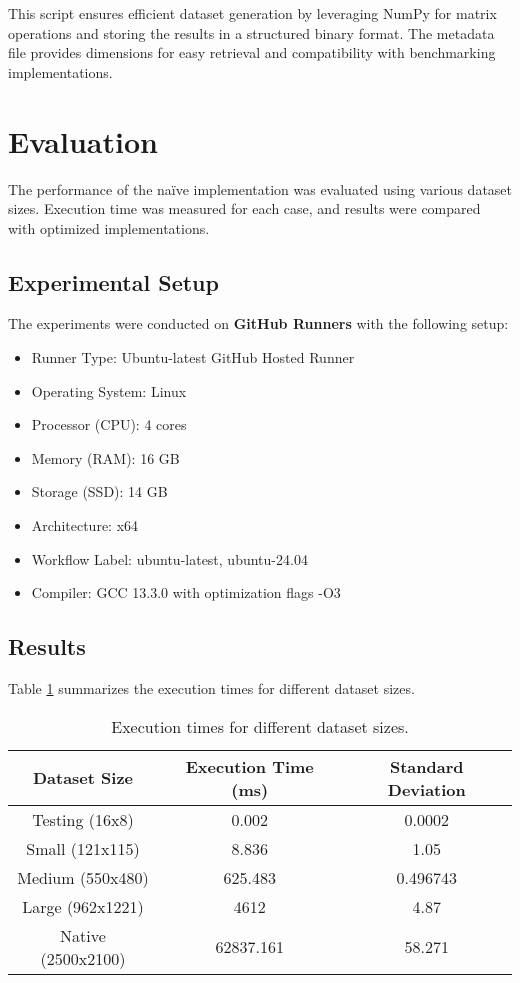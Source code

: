 \documentclass[12pt]{article}
\begin{document}
This script ensures efficient dataset generation by leveraging NumPy for matrix operations and storing the results in a structured binary format. The metadata file provides dimensions for easy retrieval and compatibility with benchmarking implementations.

\section{Evaluation}
The performance of the naïve implementation was evaluated using various dataset sizes. Execution time was measured for each case, and results were compared with optimized implementations.

\subsection{Experimental Setup}
The experiments were conducted on \textbf{GitHub Runners} with the following setup:
\begin{itemize}
    \item Runner Type: Ubuntu-latest GitHub Hosted Runner
    \item Operating System: Linux
    \item Processor (CPU): 4 cores
    \item Memory (RAM): 16 GB
    \item Storage (SSD): 14 GB
    \item Architecture: x64
    \item Workflow Label: ubuntu-latest, ubuntu-24.04
    \item Compiler: GCC 13.3.0 with optimization flags -O3
\end{itemize}

\subsection{Results}
Table \ref{tab:results} summarizes the execution times for different dataset sizes.

\begin{table}[h]
    \begin{tabular}{|c|c|c|}
        \hline
        \textbf{Dataset Size} & \textbf{Execution Time (ms)} & \textbf{Standard Deviation} \\
        \hline
        Testing (16x8) & 0.002 & 0.0002 \\
        Small (121x115) & 8.836 & 1.05 \\
        Medium (550x480) & 625.483 & 0.496743 \\
        Large (962x1221) & 4612 & 4.87 \\
        Native (2500x2100) & 62837.161 &58.271 \\
        \hline
    \end{tabular}
        \caption{Execution times for different dataset sizes.}
        \label{tab:results}
    \end{table}
\end{document}
